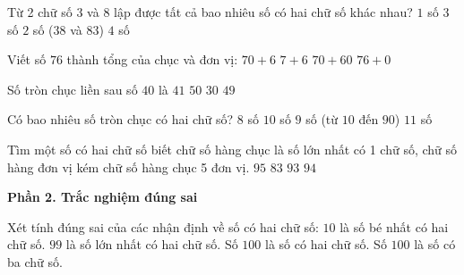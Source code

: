 \begin{ex} %
Từ 2 chữ số $3$ và $8$ lập được tất cả bao nhiêu số có hai chữ số khác nhau?
\choice
{$1$ số}
{$3$ số}
{\True $2$ số ($38$ và $83$)}
{$4$ số}
\end{ex}

\begin{ex} %
Viết số $76$ thành tổng của chục và đơn vị:
\choice
{\True $70 + 6$}
{$7 + 6$}
{$70 + 60$}
{$76 + 0$}
\end{ex}

\begin{ex} %
Số tròn chục liền sau số $40$ là
\choice
{$41$}
{\True $50$}
{$30$}
{$49$}
\end{ex}

\begin{ex} %
Có bao nhiêu số tròn chục có hai chữ số?
\choice
{$8$ số}
{$10$ số}
{\True $9$ số (từ $10$ đến $90$)}
{$11$ số}
\end{ex}

\begin{ex} %
Tìm một số có hai chữ số biết chữ số hàng chục là số lớn nhất có 1 chữ số, chữ số hàng đơn vị kém chữ số hàng chục 5 đơn vị.
\choice
{$95$}
{$83$}
{$93$}
{\True $94$}
\end{ex}

\textbf{Phần 2. Trắc nghiệm đúng sai}

\begin{ex} %
Xét tính đúng sai của các nhận định về số có hai chữ số:
\choiceTF
{\True $10$ là số bé nhất có hai chữ số.}
{\True $99$ là số lớn nhất có hai chữ số.}
{Số $100$ là số có hai chữ số.}
{\True Số $100$ là số có ba chữ số.}
\end{ex}

